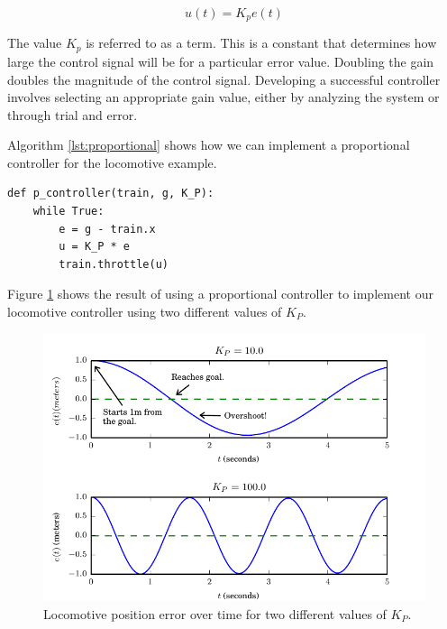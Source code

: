 \begin{equation}
 u(t) = K_p e(t)
\end{equation}

The value $K_p$ is referred to as a  term. This is a
constant that determines how large the control signal will be for a
particular error value.  Doubling the gain doubles the magnitude of
the control signal.  Developing a successful controller involves
selecting an appropriate gain value, either by analyzing the system or
through trial and error.

Algorithm \ref{lst:proportional} shows how we can implement a
proportional controller for the locomotive example.


\begin{minipage}[c]{0.95\textwidth}
\begin{lstlisting}[label={lst:proportional},caption={Proportional Control Algorithm}]
def p_controller(train, g, K_P):
    while True:
        e = g - train.x
        u = K_P * e
        train.throttle(u)

\end{lstlisting}
\end{minipage}



Figure \ref{fig:p_result} shows the result of using a proportional
controller to implement our locomotive controller using two different
values of $K_P$.

\begin{figure}
\includegraphics{pid/figs/p_result.pdf}
\caption{Locomotive position error over time for two different values of $K_P$.} 
\label{fig:p_result}
\end{figure}


